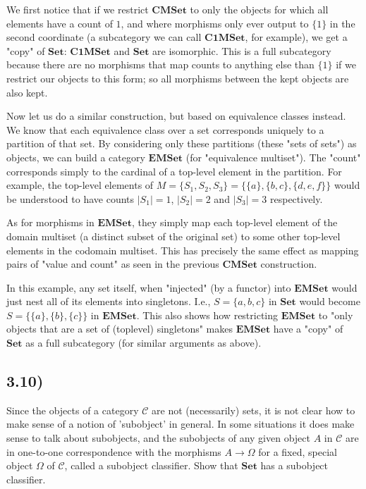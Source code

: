 \documentclass[12pt, letterpaper, twoside]{report}
\begin{document}
We first notice that if we restrict $\mathbf{CMSet}$ to only the objects for which all elements have a count of $1$, and where morphisms only ever output to $\{ 1 \}$ in the second coordinate (a subcategory we can call $\mathbf{C1MSet}$, for example), we get a "copy" of $\mathbf{Set}$: $\mathbf{C1MSet}$ and $\mathbf{Set}$ are isomorphic. This is a full subcategory because there are no morphisms that map counts to anything else than $\{ 1 \}$ if we restrict our objects to this form; so all morphisms between the kept objects are also kept. 

Now let us do a similar construction, but based on equivalence classes instead. We know that each equivalence class over a set corresponds uniquely to a partition of that set. By considering only these partitions (these "sets of sets") as objects, we can build a category $\mathbf{EMSet}$ (for "equivalence multiset"). The "count" corresponds simply to the cardinal of a top-level element in the partition. For example, the top-level elements of $M = \{ S_1, S_2, S_3 \}= \{ \{a\}, \{b, c\}, \{d, e, f\} \}$ would be understood to have counts $|S_1| = 1$, $|S_2| = 2$ and $|S_3| = 3$ respectively.

As for morphisms in $\mathbf{EMSet}$, they simply map each top-level element of the domain multiset (a distinct subset of the original set) to some other top-level elements in the codomain multiset. This has precisely the same effect as mapping pairs of "value and count" as seen in the previous $\mathbf{CMSet}$ construction.

In this example, any set itself, when "injected" (by a functor) into $\mathbf{EMSet}$ would just nest all of its elements into singletons. I.e., $S = \{ a, b, c \}$ in $\mathbf{Set}$ would become $S = \{ \{a\}, \{b\}, \{c\} \}$ in $\mathbf{EMSet}$. This also shows how restricting $\mathbf{EMSet}$ to "only objects that are a set of (toplevel) singletons" makes $\mathbf{EMSet}$ have a "copy" of $\mathbf{Set}$ as a full subcategory (for similar arguments as above).



\subsection*{3.10)}

Since the objects of a category $\mathcal{C}$ are not (necessarily) sets, it is not clear how to make sense of a notion of 'subobject' in general. In some situations it does make sense to talk about subobjects, and the subobjects of any given object $A$ in $\mathcal{C}$ are in one-to-one correspondence with the morphisms $A \to \Omega$ for a fixed, special object $\Omega$ of $\mathcal{C}$, called a subobject classifier. Show that $\mathbf{Set}$ has a subobject classifier.
\end{document}
